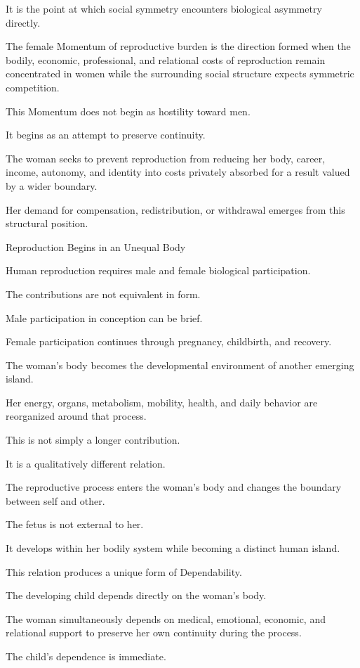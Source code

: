 It is the point at which social symmetry encounters biological asymmetry directly.

The female Momentum of reproductive burden is the direction formed when the bodily, economic, professional, and relational costs of reproduction remain concentrated in women while the surrounding social structure expects symmetric competition.

This Momentum does not begin as hostility toward men.

It begins as an attempt to preserve continuity.

The woman seeks to prevent reproduction from reducing her body, career, income, autonomy, and identity into costs privately absorbed for a result valued by a wider boundary.

Her demand for compensation, redistribution, or withdrawal emerges from this structural position.

Reproduction Begins in an Unequal Body

Human reproduction requires male and female biological participation.

The contributions are not equivalent in form.

Male participation in conception can be brief.

Female participation continues through pregnancy, childbirth, and recovery.

The woman’s body becomes the developmental environment of another emerging island.

Her energy, organs, metabolism, mobility, health, and daily behavior are reorganized around that process.

This is not simply a longer contribution.

It is a qualitatively different relation.

The reproductive process enters the woman’s body and changes the boundary between self and other.

The fetus is not external to her.

It develops within her bodily system while becoming a distinct human island.

This relation produces a unique form of Dependability.

The developing child depends directly on the woman’s body.

The woman simultaneously depends on medical, emotional, economic, and relational support to preserve her own continuity during the process.

The child’s dependence is immediate.

